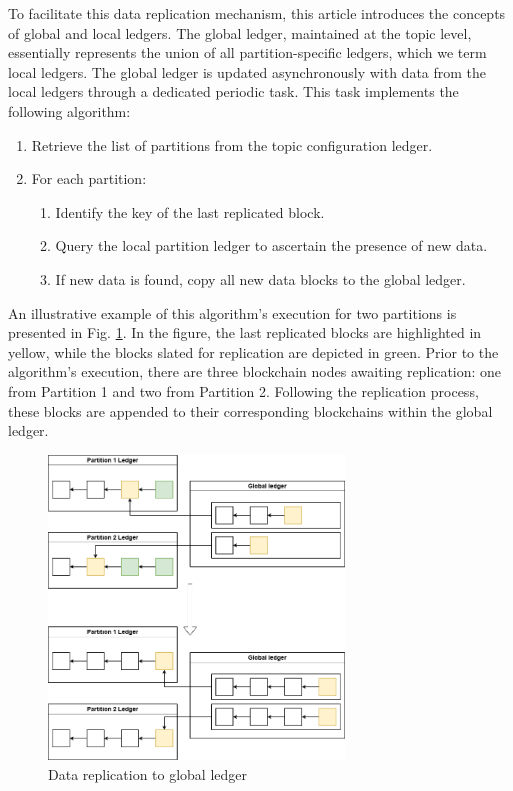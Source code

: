 \documentclass[10pt]{llncs}
\begin{document}
To facilitate this data replication mechanism, this article introduces the concepts of global and local ledgers. 
The global ledger, maintained at the topic level, essentially represents the union of all partition-specific ledgers, which we term local ledgers. 
The global ledger is updated asynchronously with data from the local ledgers through a dedicated periodic task. 
This task implements the following algorithm:

\begin{enumerate}
    \item Retrieve the list of partitions from the topic configuration ledger.
    \item For each partition:
    \begin{enumerate}
        \item Identify the key of the last replicated block.
        \item Query the local partition ledger to ascertain the presence of new data.
        \item If new data is found, copy all new data blocks to the global ledger.
    \end{enumerate}
\end{enumerate}

An illustrative example of this algorithm's execution for two partitions is presented in Fig. \ref{global-and-local-ledgers}. 
In the figure, the last replicated blocks are highlighted in yellow, while the blocks slated for replication are depicted in green. 
Prior to the algorithm's execution, there are three blockchain nodes awaiting replication: one from Partition 1 and two from Partition 2. 
Following the replication process, these blocks are appended to their corresponding blockchains within the global ledger.

\begin{figure}[ht!]
    \centering
    \includegraphics[width=0.7\textwidth]{global-and-local-ledgers.png}
    \caption{Data replication to global ledger} \label{global-and-local-ledgers}
\end{figure}
\end{document}

